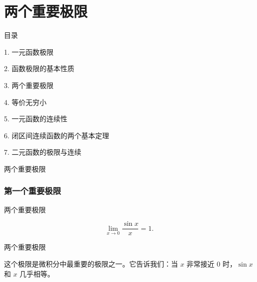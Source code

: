 \documentclass[aspectratio=169,10pt,fontset=fandol]{ctexbeamer}
\newenvironment{custom}[1]{\par\noindent\textbf{#1}\quad}{\par\vspace{0.8em}}
\begin{document}
\section{两个重要极限}
\begin{frame}[t,fragile]{目录}
\normalsize
{\color{black}\normalsize 1. 一元函数极限\par}\vspace{0.3em}
{\color{black}\normalsize 2. 函数极限的基本性质\par}\vspace{0.3em}
{\color{blue}\normalsize 3. 两个重要极限\par}\vspace{0.3em}
{\color{gray!40}\normalsize 4. 等价无穷小\par}\vspace{0.3em}
{\color{gray!40}\normalsize 5. 一元函数的连续性\par}\vspace{0.3em}
{\color{gray!40}\normalsize 6. 闭区间连续函数的两个基本定理\par}\vspace{0.3em}
{\color{gray!40}\normalsize 7. 二元函数的极限与连续\par}\vspace{0.3em}
\end{frame}
\begin{frame}[t,fragile]{两个重要极限}
\footnotesize
{\footnotesize
\subsubsection*{第一个重要极限}


}
\end{frame}
\begin{frame}[t,fragile]{两个重要极限}
\footnotesize
{\footnotesize
\[
\lim_{x \to 0} \frac{\sin x}{x} = 1.
\]


}
\end{frame}
\begin{frame}[t,fragile]{两个重要极限}
\footnotesize
{\footnotesize
这个极限是微积分中最重要的极限之一。它告诉我们：当 \(x\) 非常接近 0 时，\(\sin x\) 和 \(x\) 几乎相等。


}
\end{frame}
\end{document}
